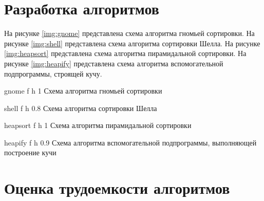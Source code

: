 \section{Разработка алгоритмов}

На рисунке \ref{img:gnome} представлена схема алгоритма гномьей сортировки. 
На рисунке \ref{img:shell} представлена схема алгоритма сортировки Шелла. 
На рисунке \ref{img:heapsort} представлена схема алгоритма пирамидальной сортировки. 
На рисунке \ref{img:heapify} представлена схема алгоритма вспомогательной подпрограммы, строящей кучу.
\clearpage

{gnome} %
{f} %
{h} %
{1\textwidth} %
{Схема алгоритма гномьей сортировки} %

{shell} %
{f} %
{h} %
{0.8\textwidth} %
{Схема алгоритма сортировки Шелла} %


{heapsort} %
{f} %
{h} %
{1\textwidth} %
{Схема алгоритма пирамидальной сортировки} %

{heapify} %
{f} %
{h} %
{0.9\textwidth} %
{Схема алгоритма вспомогательной подпрограммы, выполняющей построение кучи} %

\clearpage

\section{Оценка трудоемкости алгоритмов}

